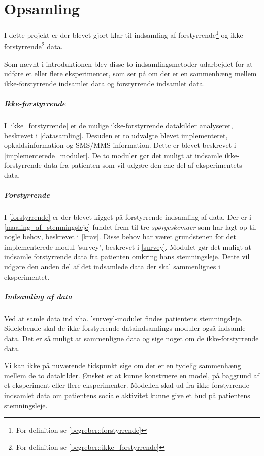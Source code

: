 \chapter{Opsamling}
I dette projekt er der blevet gjort klar til indsamling af  forstyrrende\footnote{For definition se \cref{begreber::forstyrrende}} og ikke-forstyrrende\footnote{For definition se \cref{begreber::ikke_forstyrrende}} data. 

Som nævnt i introduktionen blev disse to indsamlingsmetoder udarbejdet for at udføre et eller flere eksperimenter, som ser på om der er en sammenhæng mellem ikke-forstyrrende indsamlet data og forstyrrende indsamlet data.
 

\paragraph{Ikke-forstyrrende}
I \cref{ikke_forstyrrende} er de mulige ikke-forstyrrende datakilder analyseret, beskrevet i \cref{datasamling}.
Desuden er to udvalgte blevet implementeret, opkaldsinformation og SMS/MMS information.
Dette er blevet beskrevet i \cref{implementerede_moduler}.
De to moduler gør det muligt at indsamle ikke-forstyrrende data fra patienten som vil udgøre den ene del af eksperimentets data.

\paragraph{Forstyrrende}
I \cref{forstyrrende} er der blevet kigget på forstyrrende indsamling af data.
Der er i \cref{maaling_af_stemningsleje} fundet frem til tre \textit{spørgeskemaer} som har lagt op til nogle behov, beskrevet i \cref{krav}.
Disse behov har været grundstenen for det implementerede modul 'survey', beskrevet i \cref{survey}.
Modulet gør det muligt at indsamle forstyrrende data fra patienten omkring hans stemningsleje.
Dette vil udgøre den anden del af det indsamlede data der skal sammenlignes i eksperimentet.

\paragraph{Indsamling af data}
Ved at samle data ind vha. 'survey'-modulet findes patientens stemningsleje.
Sideløbende skal de ikke-forstyrrende dataindsamlings-moduler også indsamle data.
Det er så muligt at sammenligne data og sige noget om de ikke-forstyrrende data.

Vi kan ikke på nuværende tidspunkt sige om der er en tydelig sammenhæng mellem de to datakilder. 
Ønsket er at kunne konstruere en model, på baggrund af et eksperiment eller flere eksperimenter.
Modellen skal ud fra ikke-forstyrrende indsamlet data om patientens sociale aktivitet kunne give et bud på patientens stemningsleje.